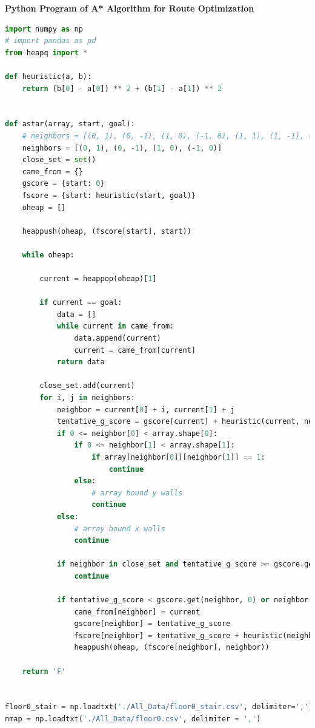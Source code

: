 \documentclass{mcmthesis}
\begin{document}
\noindent\textbf{\Large{Python Program of A* Algorithm for Route Optimization}}
\lstset{
basicstyle=\sffamily,
keywordstyle=\bfseries,
commentstyle=\rmfamily\itshape,
stringstyle=\ttfamily,
flexiblecolumns,
numbers=left,
numberstyle=\footnotesize}
\begin{lstlisting}[language=Python]
import numpy as np
# import pandas as pd
from heapq import *

def heuristic(a, b):
    return (b[0] - a[0]) ** 2 + (b[1] - a[1]) ** 2


def astar(array, start, goal):
    # neighbors = [(0, 1), (0, -1), (1, 0), (-1, 0), (1, 1), (1, -1), (-1, 1), (-1, -1)]
    neighbors = [(0, 1), (0, -1), (1, 0), (-1, 0)]
    close_set = set()
    came_from = {}
    gscore = {start: 0}
    fscore = {start: heuristic(start, goal)}
    oheap = []

    heappush(oheap, (fscore[start], start))

    while oheap:

        current = heappop(oheap)[1]

        if current == goal:
            data = []
            while current in came_from:
                data.append(current)
                current = came_from[current]
            return data

        close_set.add(current)
        for i, j in neighbors:
            neighbor = current[0] + i, current[1] + j
            tentative_g_score = gscore[current] + heuristic(current, neighbor)
            if 0 <= neighbor[0] < array.shape[0]:
                if 0 <= neighbor[1] < array.shape[1]:
                    if array[neighbor[0]][neighbor[1]] == 1:
                        continue
                else:
                    # array bound y walls
                    continue
            else:
                # array bound x walls
                continue

            if neighbor in close_set and tentative_g_score >= gscore.get(neighbor, 0):
                continue

            if tentative_g_score < gscore.get(neighbor, 0) or neighbor not in [i[1] for i in oheap]:
                came_from[neighbor] = current
                gscore[neighbor] = tentative_g_score
                fscore[neighbor] = tentative_g_score + heuristic(neighbor, goal)
                heappush(oheap, (fscore[neighbor], neighbor))

    return 'F'


floor0_stair = np.loadtxt('./All_Data/floor0_stair.csv', delimiter=',')
nmap = np.loadtxt('./All_Data/floor0.csv', delimiter = ',')


\end{lstlisting}
\end{document}
